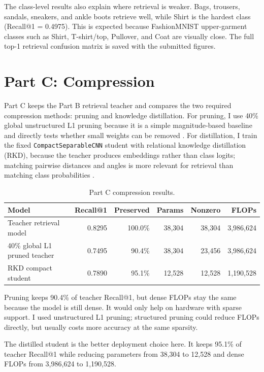 \documentclass[11pt,a4paper]{article}
\newcommand{\model}[1]{\texttt{#1}}
\begin{document}
The class-level results also explain where retrieval is weaker. Bags, trousers, sandals, sneakers, and ankle boots retrieve well, while Shirt is the hardest class (Recall@1 = 0.4975). This is expected because FashionMNIST upper-garment classes such as Shirt, T-shirt/top, Pullover, and Coat are visually close. The full top-1 retrieval confusion matrix is saved with the submitted figures.

\section{Part C: Compression}

Part C keeps the Part B retrieval teacher and compares the two required compression methods: pruning and knowledge distillation. For pruning, I use 40\% global unstructured L1 pruning because it is a simple magnitude-based baseline and directly tests whether small weights can be removed \cite{han2015learning}. For distillation, I train the fixed \model{CompactSeparableCNN} student with relational knowledge distillation (RKD), because the teacher produces embeddings rather than class logits; matching pairwise distances and angles is more relevant for retrieval than matching class probabilities \cite{park2019relational}.

\begin{table}[H]
\centering
\small
\begin{tabular}{lrrrrr}
\toprule
\textbf{Model} & \textbf{Recall@1} & \textbf{Preserved} & \textbf{Params} & \textbf{Nonzero} & \textbf{FLOPs} \\
\midrule
Teacher retrieval model & 0.8295 & 100.0\% & 38,304 & 38,304 & 3,986,624 \\
40\% global L1 pruned teacher & 0.7495 & 90.4\% & 38,304 & 23,456 & 3,986,624 \\
RKD compact student & 0.7890 & 95.1\% & 12,528 & 12,528 & 1,190,528 \\
\bottomrule
\end{tabular}
\caption{Part C compression results.}
\label{tab:partc}
\end{table}

Pruning keeps 90.4\% of teacher Recall@1, but dense FLOPs stay the same because the model is still dense. It would only help on hardware with sparse support. I used unstructured L1 pruning; structured pruning could reduce FLOPs directly, but usually costs more accuracy at the same sparsity.

The distilled student is the better deployment choice here. It keeps 95.1\% of teacher Recall@1 while reducing parameters from 38,304 to 12,528 and dense FLOPs from 3,986,624 to 1,190,528.
\end{document}
